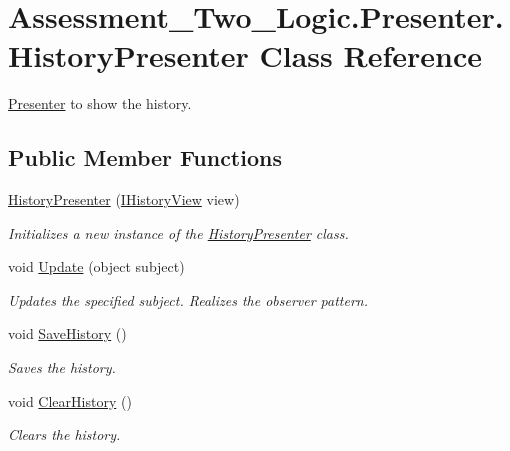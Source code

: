 \hypertarget{class_assessment___two___logic_1_1_presenter_1_1_history_presenter}{
\section{Assessment\_\-Two\_\-Logic.Presenter.HistoryPresenter Class Reference}
\label{class_assessment___two___logic_1_1_presenter_1_1_history_presenter}
}


\hyperlink{namespace_assessment___two___logic_1_1_presenter}{Presenter} to show the history.  


\subsection*{Public Member Functions}
\begin{DoxyCompactItemize}
\item 
\hyperlink{class_assessment___two___logic_1_1_presenter_1_1_history_presenter_abb00dd8d9dd8867e431735371b2f1026}{HistoryPresenter} (\hyperlink{interface_assessment___two___logic_1_1_interfaces_1_1_i_history_view}{IHistoryView} view)
\begin{DoxyCompactList}\small\item\em Initializes a new instance of the \hyperlink{class_assessment___two___logic_1_1_presenter_1_1_history_presenter}{HistoryPresenter} class. \item\end{DoxyCompactList}\item 
void \hyperlink{class_assessment___two___logic_1_1_presenter_1_1_history_presenter_a3c5d1bd9132da6ee296c31e9d058db89}{Update} (object subject)
\begin{DoxyCompactList}\small\item\em Updates the specified subject. Realizes the observer pattern. \item\end{DoxyCompactList}\item 
void \hyperlink{class_assessment___two___logic_1_1_presenter_1_1_history_presenter_aaf3c05abcbc97b927a1dc91a8bb6a329}{SaveHistory} ()
\begin{DoxyCompactList}\small\item\em Saves the history. \item\end{DoxyCompactList}\item 
void \hyperlink{class_assessment___two___logic_1_1_presenter_1_1_history_presenter_a954024c204979742853278a26aad9250}{ClearHistory} ()
\begin{DoxyCompactList}\small\item\em Clears the history. \item\end{DoxyCompactList}\end{DoxyCompactItemize}
